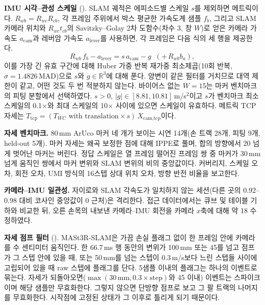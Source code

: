 \documentclass[conference,10pt]{IEEEtran}
\newcommand{\mm}{\,mm\xspace}
\begin{document}
\textbf{IMU 시각--관성 스케일} (). SLAM 궤적은 에피소드별 스케일 $s$를 제외하면 메트릭이다.
$R_{wb}=R_{wc}R_{cb}$, 각 프레임 주위에서 박스 평균한 가속도계 샘플 $f_b$, 그리고 SLAM 카메라 위치와 $R_{wc}t_{cb}$의
Savitzky--Golay 2차 도함수(차수 3, 창 $W$)로 얻은 카메라 가속도 $a_\text{cam}$과 레버암 가속도 $a_\text{lever}$를 사용하면, 각
프레임은 다음 식의 세 행을 제공한다.
\begin{equation}
R_{wb}\,f_b - a_\text{lever} = s\,a_\text{cam} - g\;\;(+\,R_{wb}b_a),
\end{equation}
이를 가장 긴 유효 구간에 대해 Huber 가중 반복 재가중 최소제곱(10회 반복, $\sigma=1.4826\,$MAD)으로 $s$와 $g\in\mathbb{R}^3$에 대해
푼다. 양변이 같은 필터를 거치므로 대역 제한이 같고, 어떤 것도 두 번 적분하지 않는다. 바이어스 없는 $W=15$는 마커 벤치마크의 피팅
분할에서 선택하였다. $s>0$, $|g|\in[8.81,10.81]$\,m/s$^2$이고 $s$가 벤치마크 최소 스케일의 0.1$\times$와 최대 스케일의 10$\times$
사이에 있으면 스케일이 유효하다. 메트릭 TCP 자세는 $T_\text{tcp}=(T_{WC}\text{ with translation}\times s)\,X_\text{cam,tcp}$이다.

\textbf{자세 벤치마크.} 80\mm{} ArUco 마커 네 개가 보이는 시연 14개(손 트랙 28개, 피팅 9개, held-out 5개). 마커 자세는 왜곡 보정한
점에 대해 IPPE로 풀며, 합의 방향에서 20\textdegree{} 넘게 벗어난 마커는 버린다. 정답 스케일은 열 프레임 떨어진 프레임 쌍 중 마커가
30\mm{} 넘게 움직인 쌍에서 마커 변위와 SLAM 변위의 비의 중앙값이다. 커버리지, 스케일 오차, 회전 오차, UMI 방식의 16스텝 상대 위치
오차, 방향 반전 비율을 보고한다.

\textbf{카메라--IMU 일관성.} 자이로와 SLAM 각속도가 일치하지 않는 세션(다른 곳의 0.92--0.98 대비 코사인 중앙값이 0 근처)은 격리한다.
접근 데이터에서는 큐브 및 테이블 기하와 비교한 뒤, 오른 손목의 내보낸 카메라--IMU 회전을 카메라 $x$축에 대해 약
18\textdegree{} 수정하였다.

\textbf{자세 점프 필터} (). MASt3R-SLAM은 가끔 손실 플래그 없이 한 프레임 안에
카메라를 수 센티미터 움직인다. 한 66.7\,ms 행 동안의 변위가 100\mm{} 또는 45\textdegree{}를 넘고 점프가 그 스텝 안에 있을 때, 또는
50\mm{}를 넘는 스텝이 0.3\,m/s보다 느린 스텝들 사이에 고립되어 있을 때 raw 스텝에 플래그를 단다. 5샘플 이내의 플래그는 하나의
이벤트로 묶는다. 자세가 되돌아오면($\max(30\,\text{mm}, 0.3\times\text{step})$와 45\textdegree{} 이내) 이벤트는 스파이크이며 해당
샘플만 무효화한다. 그렇지 않으면 단방향 점프로 보고 그 팔 트랙의 나머지를 무효화한다. 시작점에 고정된 상태가 그 이후로 틀리게 되기
때문이다.
\end{document}
